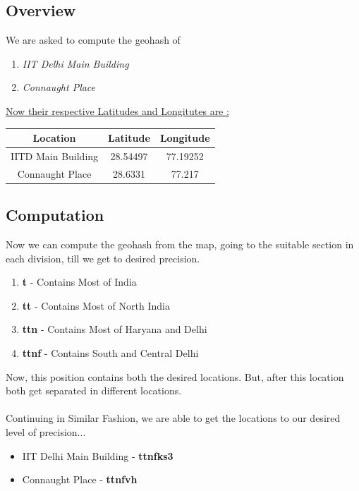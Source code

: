 \documentclass{article}
\begin{document}
\subsection*{Overview}
We are asked to compute the geohash of
\begin{enumerate}
    \item \emph{IIT Delhi Main Building}
    \item \emph{Connaught Place}
\end{enumerate}
\underline{Now their respective Latitudes and Longitutes are :}
\begin{center}
    \begin{tabular}{||c||c|c||}
    \hline
        Location & Latitude & Longitude \\
    \hline
        IITD Main Building & 28.54497 & 77.19252\\
    \hline
        Connaught Place & 28.6331 & 77.217\\
    \hline
    \end{tabular}
\end{center}
\subsection*{Computation}
Now we can compute the geohash from the map, going to the suitable section in each division, till we get to desired precision.
\begin{center}
    \begin{enumerate}
        \item \textbf{t} - Contains Most of India
        \item \textbf{tt} - Contains Most of North India
        \item \textbf{ttn} - Contains Most of Haryana and Delhi
        \item \textbf{ttnf} - Contains South and Central Delhi
    \end{enumerate}
\end{center}
Now, this position contains both the desired locations. But, after this location both get separated in different locations. \\ \\

Continuing in Similar Fashion, we are able to get the locations to our desired level of precision...
\begin{itemize}
    \item IIT Delhi Main Building - \textbf{ttnfks3}
    \item Connaught Place - \textbf{ttnfvh}
\end{itemize}
    
\end{document}
